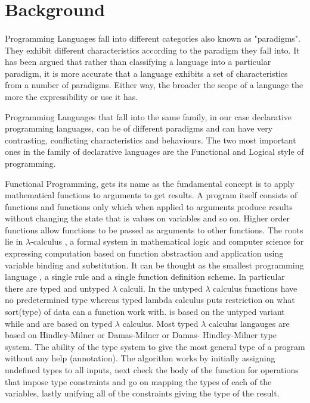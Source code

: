 \documentclass[proposal.tex]{subfiles}
\begin{document}
\section{Background}\label{sect:background}

\paragraph{} 
Programming Languages fall into different categories also known as "paradigms". They exhibit different 
characteristics according to the paradigm they fall into. It has been argued 
\cite{Krishnamurthi:2008:TPL:1480828.1480846} that rather than classifying a language into a particular paradigm, it 
is more accurate that a language exhibits a set of characteristics from a number of paradigms. Either way, the 
broader the scope of a language the more the expressibility or use it has.  

\par Programming Languages that fall into the same family, in our case declarative programming languages, can 
be of different paradigms and can have very contrasting, conflicting characteristics and behaviours. The two most 
important ones in the family of declarative languages are the Functional and Logical style of programming.

\par Functional Programming, \cite{hughes1989functional} gets its name as the fundamental concept is to apply 
mathematical functions to arguments to get results. A program itself consists of functions and functions only which 
when applied to arguments produce results without changing the state that is values on variables and so on. Higher 
order functions allow functions to be passed as arguments to other functions. The roots lie in $\lambda$-calculus 
\cite{website:lambdacalculuswiki}, a formal system in mathematical logic and computer science for expressing 
computation based on function abstraction and application using variable binding and substitution.  It can be 
thought as the smallest programming language \cite{rojas2004tutorial}, a single rule and a single function 
definition scheme. In particular there are typed and untyped $\lambda$ calculi. In the untyped $\lambda$ calculus 
functions have no predetermined type whereas typed lambda calculus puts restriction on what sort(type) of data 
can a function work with.  is based on the untyped variant while  and 
 are based on typed $\lambda$ calculus. Most typed $\lambda$ calculus langauges are based 
on Hindley-Milner or Damas-Milner or Damas- Hindley-Milner \cite{website:hdmtypesystemwiki} type system. 
The ability of the type system to give the most general type of a program without any help (annotation).  The 
algorithm \cite{website:hdmtypesystem} works by initially assigning undefined types to all inputs, next check the 
body of the function for operations that impose type constraints and go on mapping the types of each of the 
variables, lastly unifying all of the constraints giving the type of the result. 
\end{document}
